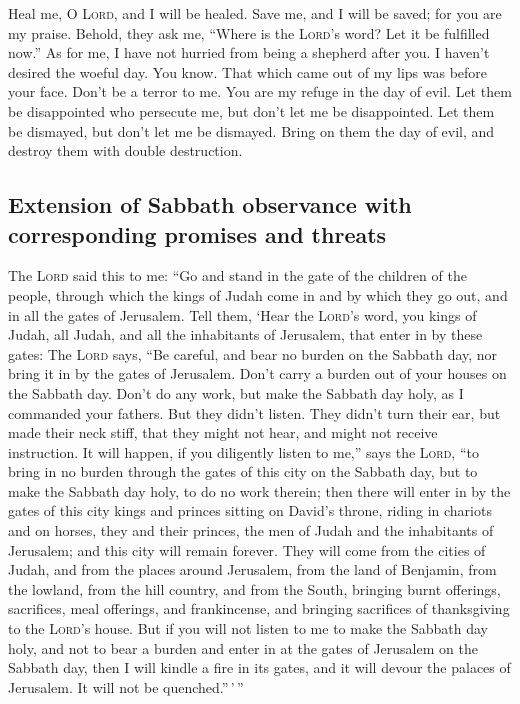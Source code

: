  Heal me, O \textsc{Lord}, and I will be healed. Save me,
and I will be saved; for you are my praise.  Behold, they
ask me, ``Where is the \textsc{Lord}'s word? Let it be fulfilled now.''
 As for me, I have not hurried from being a shepherd
after you. I haven't desired the woeful day. You know. That which came
out of my lips was before your face.  Don't be a terror
to me. You are my refuge in the day of evil.  Let them be
disappointed who persecute me, but don't let me be disappointed. Let
them be dismayed, but don't let me be dismayed. Bring on them the day of
evil, and destroy them with double destruction.

\hypertarget{extension-of-sabbath-observance-with-corresponding-promises-and-threats}{%
\subsection{Extension of Sabbath observance with corresponding promises
and
threats}\label{extension-of-sabbath-observance-with-corresponding-promises-and-threats}}

 The \textsc{Lord} said this to me: ``Go and stand in the
gate of the children of the people, through which the kings of Judah
come in and by which they go out, and in all the gates of Jerusalem.
 Tell them, `Hear the \textsc{Lord}'s word, you kings of
Judah, all Judah, and all the inhabitants of Jerusalem, that enter in by
these gates:  The \textsc{Lord} says, ``Be careful, and
bear no burden on the Sabbath day, nor bring it in by the gates of
Jerusalem.  Don't carry a burden out of your houses on
the Sabbath day. Don't do any work, but make the Sabbath day holy, as I
commanded your fathers.  But they didn't listen. They
didn't turn their ear, but made their neck stiff, that they might not
hear, and might not receive instruction.  It will happen,
if you diligently listen to me,'' says the \textsc{Lord}, ``to bring in
no burden through the gates of this city on the Sabbath day, but to make
the Sabbath day holy, to do no work therein;  then there
will enter in by the gates of this city kings and princes sitting on
David's throne, riding in chariots and on horses, they and their
princes, the men of Judah and the inhabitants of Jerusalem; and this
city will remain forever.  They will come from the cities
of Judah, and from the places around Jerusalem, from the land of
Benjamin, from the lowland, from the hill country, and from the South,
bringing burnt offerings, sacrifices, meal offerings, and frankincense,
and bringing sacrifices of thanksgiving to the \textsc{Lord}'s house.
 But if you will not listen to me to make the Sabbath day
holy, and not to bear a burden and enter in at the gates of Jerusalem on
the Sabbath day, then I will kindle a fire in its gates, and it will
devour the palaces of Jerusalem. It will not be quenched.''\,'\,''

